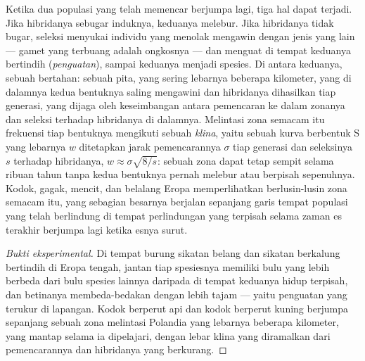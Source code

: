 \begin{proposition}\label{prop:b2:speciation:reinforcement}
Ketika dua populasi yang telah memencar berjumpa lagi, tiga hal dapat
terjadi. Jika hibridanya sebugar induknya, keduanya melebur. Jika
hibridanya tidak bugar, seleksi menyukai individu yang menolak
mengawin dengan jenis yang lain --- gamet yang terbuang adalah
ongkosnya --- dan  menguat di tempat
keduanya bertindih (\emph{penguatan}), sampai keduanya menjadi spesies.
Di antara keduanya, sebuah \emph{} bertahan: sebuah pita,
yang sering lebarnya beberapa kilometer, yang di dalamnya kedua
bentuknya saling mengawini dan hibridanya dihasilkan tiap generasi,
yang dijaga oleh keseimbangan antara pemencaran ke dalam zonanya dan
seleksi terhadap hibridanya di dalamnya. Melintasi zona semacam itu
frekuensi tiap bentuknya mengikuti sebuah \emph{klina}, yaitu sebuah
kurva berbentuk S yang lebarnya $w$ ditetapkan jarak pemencarannya
$\sigma$ tiap generasi dan seleksinya $s$ terhadap hibridanya, $w \approx
\sigma\sqrt{8/s}$: sebuah zona dapat tetap sempit selama ribuan
tahun tanpa kedua bentuknya pernah melebur atau berpisah sepenuhnya.
Kodok, gagak, mencit, dan belalang Eropa memperlihatkan berlusin-lusin
zona semacam itu, yang sebagian besarnya berjalan sepanjang garis
tempat populasi yang telah berlindung di tempat perlindungan yang
terpisah selama zaman es terakhir berjumpa lagi ketika esnya surut.
\end{proposition}
\begin{proof}[Bukti eksperimental]
Di tempat burung sikatan belang dan sikatan berkalung bertindih di
Eropa tengah, jantan tiap spesiesnya memiliki bulu yang lebih berbeda
dari bulu spesies lainnya daripada di tempat keduanya hidup terpisah,
dan betinanya membeda-bedakan dengan lebih tajam --- yaitu penguatan
yang terukur di lapangan. Kodok berperut api dan kodok berperut kuning
berjumpa sepanjang sebuah zona melintasi Polandia yang lebarnya
beberapa kilometer, yang mantap selama ia dipelajari, dengan lebar
klina yang diramalkan dari pemencarannya dan  hibridanya yang
berkurang.
\end{proof}

